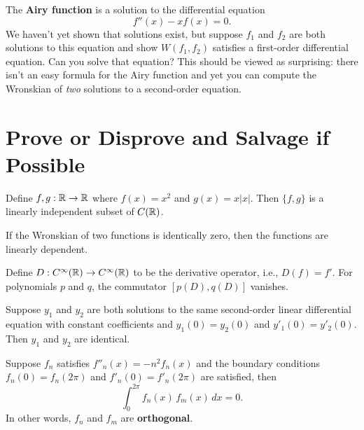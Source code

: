 \documentclass{homework}
\begin{document}
\begin{problem}\label{introduction-airy-function}The \textbf{Airy function} is a solution to the differential equation
  \[
    f''(x) - x f(x) = 0.
  \]
  We haven't yet shown that solutions exist, but suppose $f_1$ and
  $f_2$ are both solutions to this equation and show $W(f_1,f_2)$
  satisfies a first-order differential equation.  Can you solve that
  equation?  This should be viewed as surprising: there isn't an easy
  formula for the Airy function and yet you can compute the Wronskian
  of \textit{two} solutions to a second-order equation.
\end{problem}

\section{Prove or Disprove and Salvage if Possible}

\begin{problem}
  Define $f, g : \mathbb{R} \to \mathbb{R}$ where $f(x) = x^2$ and $g(x) = x |x|$.  Then $\{ f, g \}$ is a linearly independent subset of $C(\mathbb{R})$.
\end{problem}

\begin{problem}\label{wronskian-misconception}If the Wronskian of two functions is identically zero, then the
  functions are linearly dependent.
\end{problem}

\begin{problem}Define $D : C^\infty(\mathbb{R}) \to C^\infty(\mathbb{R})$ to be the
  derivative operator, i.e., $D(f) = f'$.  For polynomials $p$ and
  $q$, the commutator $[p(D),q(D)]$ vanishes.
\end{problem}

\begin{problem}\label{uniqueness-for-second-order}Suppose $y_1$ and $y_2$ are both solutions to the same second-order linear differential equation with constant coefficients and $y_1(0) = y_2(0)$ and $y'_1(0) = y'_2(0)$.  Then $y_1$ and $y_2$ are identical.
\end{problem}

\begin{problem}\label{wave-equation-orthogonal}Suppose $f_n$ satisfies $f''_n(x) = - n^2 f_n(x)$ and the boundary conditions $f_n(0) = f_n(2\pi)$ and $f'_n(0) = f'_n(2\pi)$ are satisfied, then
  \[
    \int_0^{2\pi} f_n(x) \, f_m(x) \, dx = 0.
  \]
  In other words, $f_n$ and $f_m$ are \textbf{orthogonal}.
\end{problem}
\end{document}
